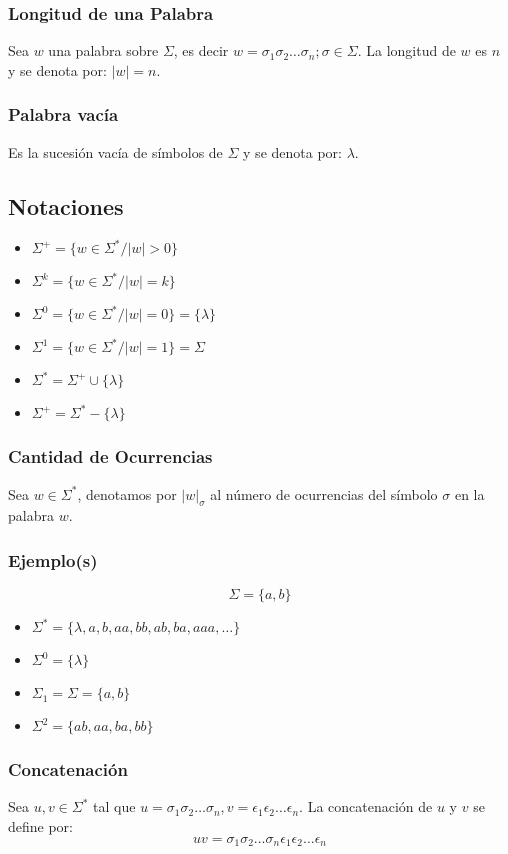 \subsubsection{Longitud de una Palabra}
Sea $w$ una palabra sobre $\Sigma$, es decir $w=\sigma_1\sigma_2\ldots\sigma_n ; \sigma\in\Sigma$. La longitud de $w$ es $n$ y se denota por: $|w|=n$.
\subsubsection{Palabra vacía}
Es la sucesión vacía de símbolos de $\Sigma$ y se denota por: $\lambda$.
\subsection{Notaciones}
\begin{itemize}
\item $\Sigma^+ = \{ w\in\Sigma^* / |w|>0\}$
\item $\Sigma^k = \{ w\in\Sigma^* / |w|=k\}$
\item $\Sigma^0 = \{ w\in\Sigma^* / |w|=0\}=\{\lambda\}$
\item $\Sigma^1 = \{ w\in\Sigma^* / |w|=1\}=\Sigma$
\item $\Sigma^* = \Sigma^+ \cup \{\lambda\}$
\item $\Sigma^+ = \Sigma^* - \{\lambda\}$
\end{itemize}
\subsubsection{Cantidad de Ocurrencias}
Sea $w\in\Sigma^*$, denotamos por $|w|_\sigma$ al número de ocurrencias del símbolo $\sigma$ en la palabra $w$.
\subsubsection{Ejemplo(s)}
$$\Sigma = \{ a,b \} $$

\begin{itemize}
\item $\Sigma^{*}= \{\lambda, a,b,aa,bb,ab,ba,aaa,\ldots\}$
\item $\Sigma^0=\{\lambda\}$
\item $\Sigma_1 =\Sigma = \{a,b\}$
\item $\Sigma^2 = \{ ab,aa,ba,bb \}$
\end{itemize}
\subsubsection{Concatenación}
Sea $u,v\in\Sigma^*$ tal que $u=\sigma_1\sigma_2\ldots\sigma_n, v=\epsilon_1\epsilon_2\ldots\epsilon_n$. La concatenación de $u$ y $v$ se define por:
$$uv=\sigma_1\sigma_2\ldots\sigma_n \epsilon_1\epsilon_2\ldots\epsilon_n$$

